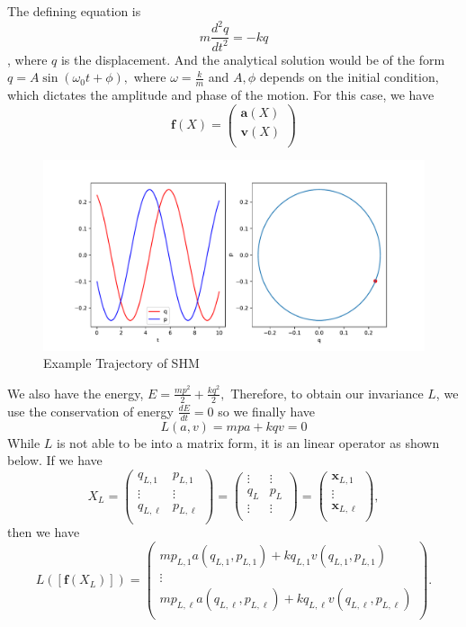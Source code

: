 \documentclass{statsmsc}
\begin{document}
The defining equation is $$m\frac{d^2q}{dt^2}=-kq$$, where $q$ is the displacement.
And the analytical solution would be of the form $q=A\sin(\omega_0t+\phi),$ where $\omega=\frac{k}{m}$ and $A, \phi$ depends on the initial condition, which dictates the amplitude and phase of the motion. 
For this case, we have 
$$
\mathbf{f}(X)=\begin{pmatrix}
    \mathbf{a}(X)\\
    \mathbf{v}(X)\\
\end{pmatrix}
$$
\begin{figure}[H] 
  \includegraphics[width=0.6\linewidth]{../codes/figures/shm_trajectory_1D.pdf}
  \centering
  \caption{Example Trajectory of SHM}
  \label{fig:shm_trajectory}
\end{figure}
We also have the energy, $E=\frac{mp^2}{2}+\frac{kq^2}{2},$
Therefore, to obtain our invariance $L$, we use the conservation of energy $\frac{dE}{dt}=0$ so we finally have $$L(a, v)=mpa+kqv=0$$
While $L$ is not able to be into a matrix form, it is an linear operator as shown below. 
If we have $$X_L=\begin{pmatrix}
    q_{L,1} & p_{L,1}\\
    \vdots & \vdots \\
    q_{L,\ell} & p_{L,\ell}\\
\end{pmatrix}=\begin{pmatrix}
    \vdots & \vdots\\
    q_L & p_L\\
    \vdots & \vdots\\
\end{pmatrix}=\begin{pmatrix}
    \mathbf{x}_{L,1}\\
    \vdots\\
    \mathbf{x}_{L,\ell}\\
\end{pmatrix},$$
then we have 
$$
L([\mathbf{f}(X_L)]) = \begin{pmatrix}
   mp_{L,1}a(q_{L,1},p_{L,1}) + kq_{L,1}v(q_{L,1},p_{L,1})\\ 
   \vdots \\
   mp_{L,\ell}a(q_{L,\ell},p_{L,\ell}) + kq_{L,\ell}v(q_{L,\ell},p_{L,\ell})\\ 
\end{pmatrix}.
$$
\end{document}
